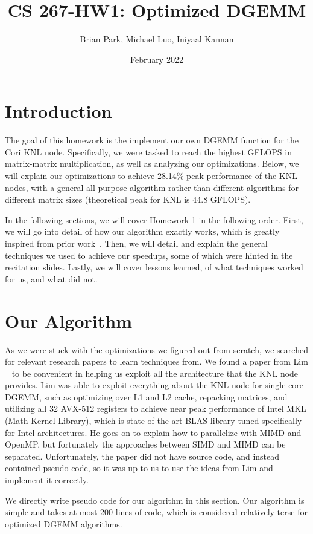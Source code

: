 \documentclass{article}
\title{CS 267-HW1: Optimized DGEMM}
\author{Brian Park, Michael Luo, Iniyaal Kannan }
\date{February 2022}
\begin{document}
\maketitle

\section{Introduction}
The goal of this homework is the implement our own DGEMM function for the Cori KNL node. Specifically, we were tasked to reach the highest GFLOPS in matrix-matrix multiplication, as well as analyzing our optimizations. Below, we will explain our optimizations to achieve 28.14\% peak performance of the KNL nodes, with a general all-purpose algorithm rather than different algorithms for different matrix sizes (theoretical peak for KNL is 44.8 GFLOPS).

In the following sections, we will cover Homework 1 in the following order. First, we will go into detail of how our algorithm exactly works, which is greatly inspired from prior work~\cite{10.1007/s10586-018-2810-y}. Then, we will detail and explain the general techniques we used to achieve our speedups, some of which were hinted in the recitation slides. Lastly, we will cover lessons learned, of what techniques worked for us, and what did not.

\section{Our Algorithm}
As we were stuck with the optimizations we figured out from scratch, we searched for relevant research papers to learn techniques from. We found a paper from Lim ~\cite{10.1007/s10586-018-2810-y} to be convenient in helping us exploit all the architecture that the KNL node provides. Lim was able to exploit everything about the KNL node for single core DGEMM, such as optimizing over L1 and L2 cache, repacking matrices, and utilizing all 32 AVX-512 registers to achieve near peak performance of Intel MKL (Math Kernel Library), which is state of the art BLAS library tuned specifically for Intel architectures. He goes on to explain how to parallelize with MIMD and OpenMP, but fortunately the approaches between SIMD and MIMD can be separated. Unfortunately, the paper did not have source code, and instead contained pseudo-code, so it was up to us to use the ideas from Lim and implement it correctly. 

We directly write pseudo code for our algorithm in this section. Our algorithm is simple and takes at most 200 lines of code, which is considered relatively terse for optimized DGEMM algorithms.
\end{document}
